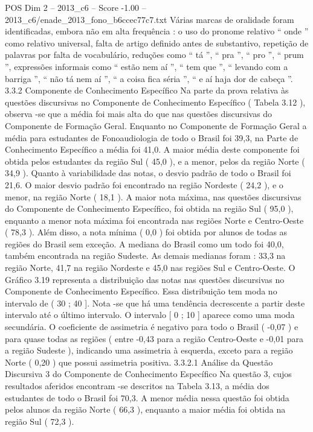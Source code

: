 \begin{textsample}{POS Dim 2 – 2013\_c6 – Score -1.00 – 2013\_c6/enade\_2013\_fono\_b6ccec77c7.txt}
Várias marcas de oralidade foram identificadas, embora não em alta frequência : o uso do pronome relativo “ onde ” como relativo universal, falta de artigo definido antes de substantivo, repetição de palavras por falta de vocabulário, reduções como “ tá ”, “ pra ”, “ pro ”, “ prum ”, expressões informais como “ estão nem aí ”, “ tem que ”, “ levando com a barriga ”, “ não tá nem aí ”, “ a coisa fica séria ”, “ e aí haja dor de cabeça ”. 3.3.2 Componente de Conhecimento Específico Na parte da prova relativa às questões discursivas no Componente de Conhecimento Específico ( Tabela 3.12 ), observa -se que a média foi mais alta do que nas questões discursivas do Componente de Formação Geral.
Enquanto no Componente de Formação Geral a média para estudantes de Fonoaudiologia de todo o Brasil foi 39,3, na Parte de Conhecimento Específico a média foi 41,0.
A maior média deste componente foi obtida pelos estudantes da região Sul ( 45,0 ), e a menor, pelos da região Norte ( 34,9 ).
Quanto à variabilidade das notas, o desvio padrão de todo o Brasil foi 21,6.
O maior desvio padrão foi encontrado na região Nordeste ( 24,2 ), e o menor, na região Norte ( 18,1 ).
A maior nota máxima, nas questões discursivas do Componente de Conhecimento Específico, foi obtida na região Sul ( 95,0 ), enquanto a menor nota máxima foi encontrada nas regiões Norte e Centro-Oeste ( 78,3 ).
Além disso, a nota mínima ( 0,0 ) foi obtida por alunos de todas as regiões do Brasil sem exceção.
A mediana do Brasil como um todo foi 40,0, também encontrada na região Sudeste.
As demais medianas foram : 33,3 na região Norte, 41,7 na região Nordeste e 45,0 nas regiões Sul e Centro-Oeste.
O Gráfico 3.19 representa a distribuição das notas nas questões discursivas no Componente de Conhecimento Específico.
Essa distribuição tem moda no intervalo de ( 30 ; 40 ].
Nota -se que há uma tendência decrescente a partir deste intervalo até o último intervalo.
O intervalo [ 0 ; 10 ] aparece como uma moda secundária.
O coeficiente de assimetria é negativo para todo o Brasil ( -0,07 ) e para quase todas as regiões ( entre -0,43 para a região Centro-Oeste e -0,01 para a região Sudeste ), indicando uma assimetria à esquerda, exceto para a região Norte ( 0,20 ) que possui assimetria positiva. 3.3.2.1 Análise da Questão Discursiva 3 do Componente de Conhecimento Específico Na questão 3, cujos resultados aferidos encontram -se descritos na Tabela 3.13, a média dos estudantes de todo o Brasil foi 70,3.
A menor média nessa questão foi obtida pelos alunos da região Norte ( 66,3 ), enquanto a maior média foi obtida na região Sul ( 72,3 ).

\end{textsample}
